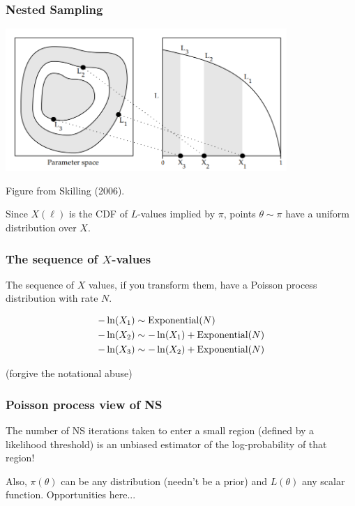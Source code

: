 \documentclass{beamer}
\begin{document}
\begin{frame}
\frametitle{Nested Sampling}

\begin{center}
\includegraphics[width=0.8\textwidth]{skilling.png}

Figure from Skilling (2006).
\end{center}

Since $X(\ell)$ is the CDF of $L$-values implied by $\pi$,
points $\theta \sim \pi$ have a uniform distribution over $X$.

\end{frame}


\begin{frame}
\frametitle{The sequence of $X$-values}
The sequence of $X$ values, if you transform them, have
a Poisson process distribution with rate $N$.

\begin{align}
-\ln(X_1) &\sim \textnormal{Exponential}(N) \\
-\ln(X_2) &\sim -\ln(X_1) + \textnormal{Exponential}(N) \\
-\ln(X_3) &\sim -\ln(X_2) + \textnormal{Exponential}(N) 
\end{align}

(forgive the notational abuse)

\end{frame}

\begin{frame}
\frametitle{Poisson process view of NS}

The number of NS iterations taken
to enter a small region (defined by a likelihood threshold) 
is an unbiased estimator of the log-probability
of that region!\vspace{0.7em}

Also, $\pi(\theta)$ can be any distribution (needn't be
a prior) and $L(\theta)$ any scalar function. Opportunities here...

\end{frame}
\end{document}

